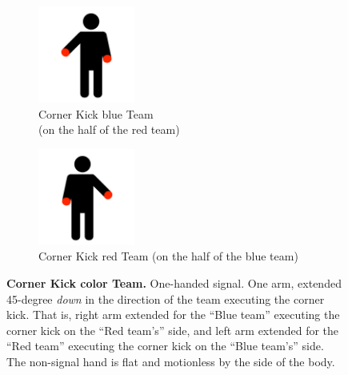         \begin{figure}[ht!]
            \centering
            \begin{subfigure}{.33\textwidth}
                \centering
                \includegraphics[height=120px]{figs/referee-signals/corner-kick.png}
                \caption{{\color{blue}Corner Kick \textlangle{}blue\textrangle{} Team}\\ (on the half of the {\color{red} red} team)}
            \end{subfigure}
            \begin{subfigure}{.33\textwidth}
                \centering
                \includegraphics[height=120px]{figs/referee-signals/corner-kick-flipped.png}
                \caption{{\color{red}Corner Kick \textlangle{}red\textrangle{} Team} (on the half of the {\color{blue} blue} team)}
            \end{subfigure}
            \caption{\textbf{Corner Kick \textlangle{}color\textrangle{} Team.} One-handed signal. One arm, extended 45-degree \emph{down} in the direction of the team executing the corner kick. That is, right arm extended for the ``Blue team'' executing the corner kick on the ``Red team's'' side, and left arm extended for the ``Red team'' executing the corner kick on the ``Blue team's'' side. The non-signal hand is flat and motionless by the side of the body.}
        \end{figure}
            
